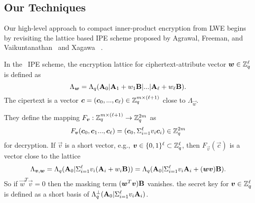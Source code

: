 \subsection{Our Techniques}
Our high-level approach to compact inner-product encryption from LWE begins by revisiting the lattice based IPE scheme proposed by Agrawal, Freeman, and Vaikuntanathan~ \cite{AC:AgrFreVai11} and Xagawa~ \cite{PKC:Xagawa13}.\

In the~ \cite{AC:AgrFreVai11} IPE scheme, the encryption lattice for ciphertext-attribute vector $\boldsymbol{w} \in \mathbb{Z}^{\ell}_{q}$ is defined as
$$\Lambda_{\boldsymbol{w}}=\Lambda_{q}(\mathbf{A}_{0}|\mathbf{A}_{1}+w_{1}\mathbf{B}|...|\mathbf{A}_{\ell}+w_{\ell}\mathbf{B}).$$
The cipertext is a vector $\boldsymbol{c}=(\boldsymbol{c}_{0},...,\boldsymbol{c}_{\ell}) \in \mathbb{Z}^{m \times (\ell+1)}_{q}$ close to $\Lambda_{\vec{w}}$.\

They define the mapping $F_{\boldsymbol{v}}: \mathbb{Z}^{m \times (\ell+1)}_{q} \rightarrow \mathbb{Z}^{2m}_{q}$ as
$$ F_{\boldsymbol{v}}(\boldsymbol{c}_{0},\boldsymbol{c}_{1}...,\boldsymbol{c}_{\ell})=(\boldsymbol{c}_{0},\Sigma^{\ell}_{i=1}v_{i}\boldsymbol{c}_{i})\in \mathbb{Z}^{2m}_{q}$$
for decryption. If $\vec{v}$ is a short vector, e.g., $\boldsymbol{v}\in \{0,1\}^{\ell} \subset \mathbb{Z}^{\ell}_{q}$, then $F_{\vec{v}}(\vec{c})$ is a vector close to the lattice
$$ \Lambda_{\boldsymbol{v},\boldsymbol{w}}=\Lambda_{q}(\mathbf{A}_{0}|\Sigma^{\ell}_{i=1}v_{i}(\mathbf{A}_{i}+w_{i}\mathbf{B}))=\Lambda_{q}(\mathbf{A}_{0}|\Sigma^{\ell}_{i=1}v_{i}\mathbf{A}_{i}+(\boldsymbol{w}\boldsymbol{v})\mathbf{B}). $$
So if $\vec{w}^{T}\vec{v}=0$ then the masking term $(\boldsymbol{w}^{T}\boldsymbol{v})\mathbf{B}$ vanishes. the secret key for $\boldsymbol{v}\in \mathbb{Z}^{\ell}_{q}$ is defined as a short basis of $\Lambda^{\perp}_{q}(\mathbf{A}_{0}|\Sigma^{\ell}_{i=1}v_{i}\mathbf{A}_{i})$.\

